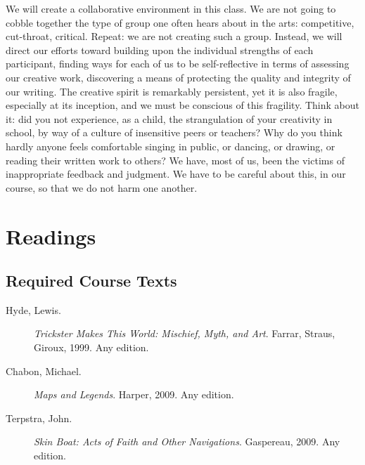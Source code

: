 \documentclass[letterpaper,10pt,headsepline]{scrreprt}
\begin{document}
We will create a collaborative environment in this class. We are not going to cobble together the type of group one often hears about in the arts: competitive, cut-throat, critical. Repeat: we are not creating such a group. Instead, we will direct our efforts toward building upon the individual strengths of each participant, finding ways for each of us to be self-reflective in terms of assessing our creative work, discovering a means of protecting the quality and integrity of our writing. The creative spirit is remarkably persistent, yet it is also fragile, especially at its inception, and
we must be conscious of this fragility. Think about it: did you not experience, as a child, the strangulation of your creativity in school, by way of a culture of insensitive peers or teachers? Why do you think hardly anyone feels comfortable singing in public, or dancing, or drawing, or reading their written work to others? We have, most of us, been the victims of inappropriate feedback and judgment. We have to be careful about this, in our course, so that we do not harm one another.

\section{Readings}
\subsection{Required Course Texts}

\begin{description}
\item [Hyde, Lewis.] \textit{Trickster Makes This World: Mischief, Myth, and Art}. Farrar, Straus, Giroux, 1999. Any edition.
\item [Chabon, Michael.] \textit{Maps and Legends}. Harper, 2009. Any edition.
\item [Terpstra, John.] \textit{Skin Boat: Acts of Faith and Other Navigations}. Gaspereau, 2009. Any edition.
\end{description}
\end{document}

